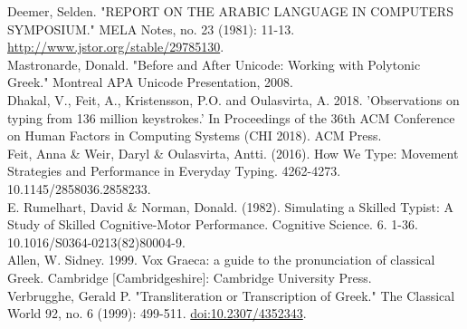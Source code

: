 \documentclass[11pt]{article}
\begin{document}
Deemer, Selden. "REPORT ON THE ARABIC LANGUAGE IN COMPUTERS SYMPOSIUM." MELA Notes, no. 23 (1981): 11-13. \url{http://www.jstor.org/stable/29785130}. \\

Mastronarde, Donald. "Before and After Unicode: Working with Polytonic Greek." Montreal APA Unicode Presentation, 2008. \\

Dhakal, V., Feit, A., Kristensson, P.O. and Oulasvirta, A. 2018. 'Observations on typing from 136 million keystrokes.' In Proceedings of the 36th ACM Conference on Human Factors in Computing Systems (CHI 2018). ACM Press. \\

Feit, Anna \& Weir, Daryl \& Oulasvirta, Antti. (2016). How We Type: Movement Strategies and Performance in Everyday Typing. 4262-4273. 10.1145/2858036.2858233. \\

E. Rumelhart, David \& Norman, Donald. (1982). Simulating a Skilled Typist: A Study of Skilled Cognitive-Motor Performance. Cognitive Science. 6. 1-36. 10.1016/S0364-0213(82)80004-9. \\

Allen, W. Sidney. 1999. Vox Graeca: a guide to the pronunciation of classical Greek. Cambridge [Cambridgeshire]: Cambridge University Press. \\

Verbrugghe, Gerald P. "Transliteration or Transcription of Greek." The Classical World 92, no. 6 (1999): 499-511. \url{doi:10.2307/4352343}.
\end{document}
